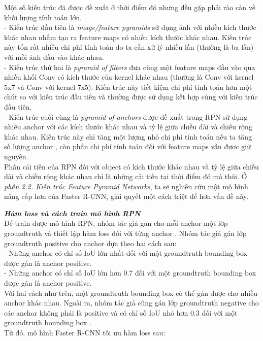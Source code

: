 {    \noindent
    Một số kiến trúc đã được đề xuất ở thời điểm đó nhưng đều gặp phải rào cản về khối lượng tính toán lớn. \\
    - Kiến trúc đầu tiên là \textit{image/feature pyramids} sử dụng ảnh với nhiều kích thước khác nhau nhằm tạo ra feature maps  có nhiều kích thước khác nhau.
    Kiến trúc này tốn rất nhiều chi phí tính toán do ta cần xử lý nhiều lần (thường là ba lần) với mỗi ảnh đầu vào khác nhau. \\
    - Kiến trúc thứ hai là \textit{pyramid of filters} đưa cùng một feature maps  đầu vào qua nhiều khối Conv có kích thước của kernel khác nhau (thường là Conv với kernel 5x7 và Conv với kernel 7x5).
    Kiến trúc này tiết kiệm chi phí tính toán hơn một chút so với kiến trúc đầu tiên và thường được sử dụng kết hợp cùng với kiến trúc đầu tiên. \\
    - Kiến trúc cuối cùng là \textit{pyramid of anchors} được đề xuất trong RPN sử dụng nhiều anchor  với các kích thước khác nhau và tỷ lệ giữa chiều dài và chiều rộng khác nhau.
    Kiến trúc này chỉ tăng một lượng nhỏ chi phí tính toán nếu ta tăng số lượng anchor , còn phần chi phí tính toán đối với feature maps  vẫn được giữ nguyên. \\
    Phần cải tiến của RPN đối với object có kích thước khác nhau và tỷ lệ giữa chiều dài và chiều rộng khác nhau chỉ là những cải tiến tại thời điểm đó mà thôi.
    Ở \textit{phần 2.2. Kiến trúc Feature Pyramid Networks}, ta sẽ nghiên cứu một mô hình nâng cấp hơn của Faster R-CNN, giải quyết một cách triệt để hơn vấn đề này.

    \noindent
    \textbf{\textit{Hàm loss và cách train mô hình RPN}} \\
    Để train được mô hình RPN, nhóm tác giả gán cho mỗi anchor  một lớp groundtruth  và thiết lập hàm loss đối với từng anchor .
    Nhóm tác giả gán lớp groundtruth  positive cho anchor  dựa theo hai cách sau: \\
    - Những anchor  có chỉ số IoU  lớn nhất đối với một groundtruth  bounding box  được gán là anchor  positive. \\
    - Những anchor  có chỉ số IoU  lớn hơn 0.7 đối với một groundtruth  bounding box  được gán là anchor  positive. \\
    Với hai cách như trên, một groundtruth  bounding box  có thể gán được cho nhiều anchor  khác nhau.
    Ngoài ra, nhóm tác giả cũng gán lớp groundtruth  negative cho các anchor  không phải là positive và có chỉ số IoU  nhỏ hơn 0.3 đối với một groundtruth  bounding box . \\
    Từ đó, mô hình Faster R-CNN tối ưu hàm loss sau:

}
